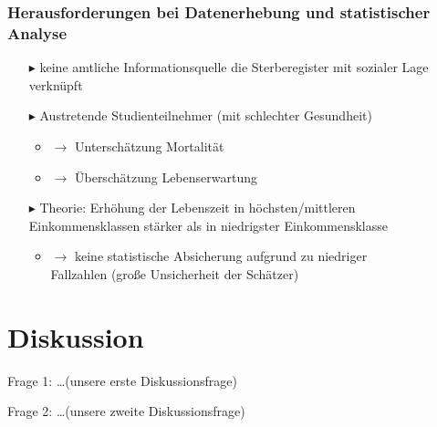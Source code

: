 \documentclass{beamer}
\begin{document}
\begin{frame}
\frametitle{Herausforderungen bei Datenerhebung und statistischer Analyse}
\begin{itemize}
   \item [$\blacktriangleright$] keine amtliche Informationsquelle die Sterberegister mit sozialer Lage verknüpft
   \item [$\blacktriangleright$] Austretende Studienteilnehmer (mit schlechter Gesundheit)
      \begin{itemize} 
         \item $\rightarrow$ Unterschätzung Mortalität
         \item $\rightarrow$ Überschätzung Lebenserwartung
      \end{itemize}
   \item [$\blacktriangleright$]Theorie: Erhöhung der Lebenszeit in höchsten/mittleren Einkommensklassen stärker als in niedrigster Einkommensklasse
      \begin{itemize}
         \item $\rightarrow$ keine statistische Absicherung aufgrund zu niedriger \\ \hspace{0.4cm} Fallzahlen (große Unsicherheit der Schätzer)
      \end{itemize}
 \end{itemize}
\end{frame}











\section{Diskussion}
\begin{frame}
	\begin{block}{Frage 1:}
		 \dots (unsere erste Diskussionsfrage)
	\end{block}
	\pause  %
	\begin{block}{Frage 2:}
		 \dots (unsere zweite Diskussionsfrage)
	\end{block}
\end{frame}
\end{document}
